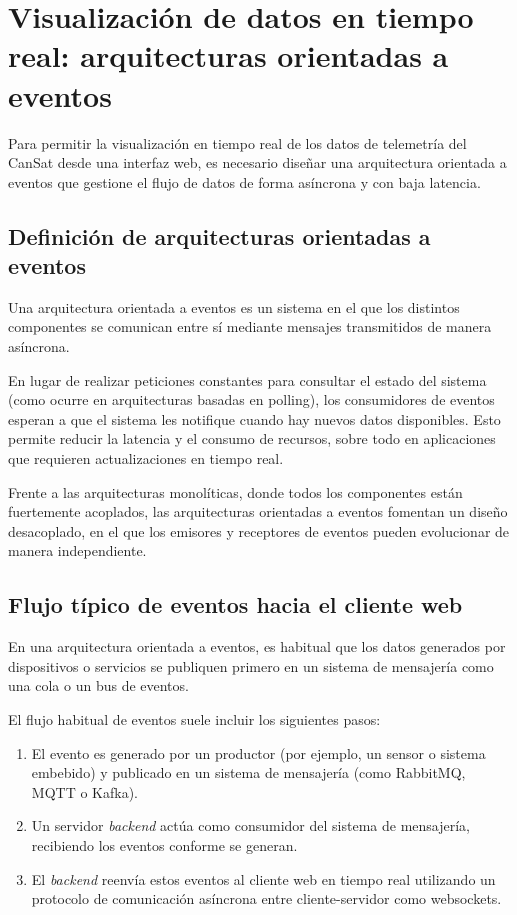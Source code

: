 \section{Visualización de datos en tiempo real: arquitecturas orientadas a eventos}

Para permitir la visualización en tiempo real de los datos de telemetría del CanSat desde una interfaz web, es necesario diseñar una arquitectura orientada a eventos que gestione el flujo de datos de forma asíncrona y con baja latencia.

\subsection{Definición de arquitecturas orientadas a eventos}

Una arquitectura orientada a eventos es un sistema en el que los distintos componentes se comunican entre sí mediante mensajes transmitidos de manera asíncrona.


En lugar de realizar peticiones constantes para consultar el estado del sistema (como ocurre en arquitecturas basadas en polling), los consumidores de eventos esperan a que el sistema les notifique cuando hay nuevos datos disponibles.
Esto permite reducir la latencia y el consumo de recursos, sobre todo en aplicaciones que requieren actualizaciones en tiempo real.

Frente a las arquitecturas monolíticas, donde todos los componentes están fuertemente acoplados, las arquitecturas orientadas a eventos fomentan un diseño desacoplado, en el que los emisores y receptores de eventos pueden evolucionar de manera independiente.

\subsection{Flujo típico de eventos hacia el cliente web}

En una arquitectura orientada a eventos, es habitual que los datos generados por dispositivos o servicios se publiquen primero en un sistema de mensajería como una cola o un bus de eventos.

El flujo habitual de eventos suele incluir los siguientes pasos:

\begin{enumerate}
    \item El evento es generado por un productor (por ejemplo, un sensor o sistema embebido) y publicado en un sistema de mensajería (como RabbitMQ, MQTT o Kafka).

    \item Un servidor \emph{backend} actúa como consumidor del sistema de mensajería, recibiendo los eventos conforme se generan.

    \item El \emph{backend} reenvía estos eventos al cliente web en tiempo real utilizando un protocolo de comunicación asíncrona entre cliente-servidor como websockets.
\end{enumerate}

